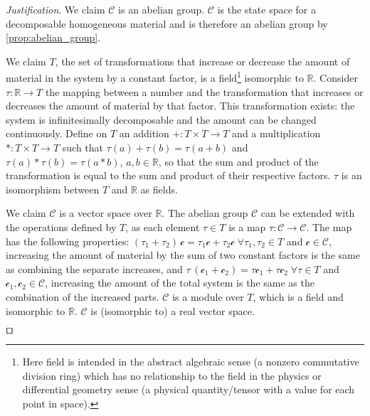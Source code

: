 \documentclass[smallextended]{svjour3}
\numberwithin{equation}{section}
\newenvironment{justification}{\emph{Justification}.}{\hfill\(\qed\)}
\begin{document}
\begin{justification}
We claim $\mathcal{C}$ is an abelian group. $\mathcal{C}$ is the state space for a decomposable homogeneous material and is therefore an abelian group  by \ref{prop:abelian_group}.

We claim $T$, the set of transformations that increase or decrease the amount of material in the system by a constant factor, is a field\footnote{Here field is intended in the abstract algebraic sense (a nonzero commutative division ring) which has no relationship to the field in the physics or differential geometry sense (a physical quantity/tensor with a value for each point in space).} isomorphic to $\mathbb{R}$. Consider $\tau: \mathbb{R} \rightarrow T$ the mapping between a number and the transformation that increases or decreases the amount of material by that factor. This transformation exists: the system is infinitesimally decomposable and the amount can be changed continuously. Define on $T$ an addition $+: T \times T \rightarrow T$ and a multiplication $*: T \times T \rightarrow T$ such that $\tau(a) + \tau(b) = \tau(a+b)$ and $\tau(a) * \tau(b) = \tau(a*b)$, $a,b \in \mathbb{R}$, so that the sum and product of the transformation is equal to the sum and product of their respective factors. $\tau$ is an isomorphism between $T$ and $\mathbb{R}$ as fields.

We claim $\mathcal{C}$ is a vector space over $\mathbb{R}$. The abelian group $\mathcal{C}$ can be extended with the operations defined by $T$, as each element $\tau \in T$ is a map $\tau : \mathcal{C} \rightarrow \mathcal{C}$. The map has the following properties: $(\tau_1 + \tau_2) \, \mathcal{c} = \tau_1 \mathcal{c} + \tau_2 \mathcal{c} \; \forall \tau_1, \tau_2 \in T$ and $\mathcal{c} \in \mathcal{C}$, increasing the amount of material by the sum of two constant factors is the same as combining the separate increases, and $\tau \, (\mathcal{c}_1 + \mathcal{c}_2) = \tau \mathcal{c}_1 + \tau \mathcal{c}_2\; \forall \tau \in T$ and $\mathcal{c}_1, \mathcal{c}_2 \in \mathcal{C}$, increasing the amount of the total system is the same as the combination of the increased parts. $\mathcal{C}$ is a module over $T$, which is a field and isomorphic to $\mathbb{R}$. $\mathcal{C}$ is (isomorphic to) a real vector space.


\end{justification}
\end{document}
